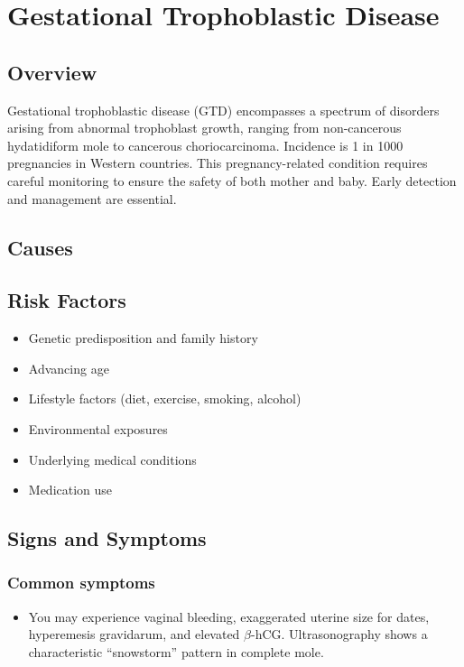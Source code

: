\chapter{Gestational Trophoblastic Disease}
\label{sec:Gestational Trophoblastic Disease}

\section{Overview}
Gestational trophoblastic disease (GTD) encompasses a spectrum of disorders arising from abnormal trophoblast growth, ranging from non-cancerous hydatidiform mole to cancerous choriocarcinoma. Incidence is 1 in 1000 pregnancies in Western countries. This pregnancy-related condition requires careful monitoring to ensure the safety of both mother and baby. Early detection and management are essential.
\section{Causes}
\section{Risk Factors}

\begin{itemize}[noitemsep]
  \item Genetic predisposition and family history
  \item Advancing age
  \item Lifestyle factors (diet, exercise, smoking, alcohol)
  \item Environmental exposures
  \item Underlying medical conditions
  \item Medication use
\end{itemize}
\section{Signs and Symptoms}

\subsection{Common symptoms}
\begin{itemize}[noitemsep]
  \item You may experience vaginal bleeding, exaggerated uterine size for dates, hyperemesis gravidarum, and elevated $\beta$-hCG. Ultrasonography shows a characteristic ``snowstorm'' pattern in complete mole. 
  \end{itemize}

